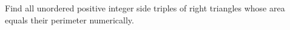 Find all unordered positive integer side triples of right triangles whose area equals their perimeter numerically.

